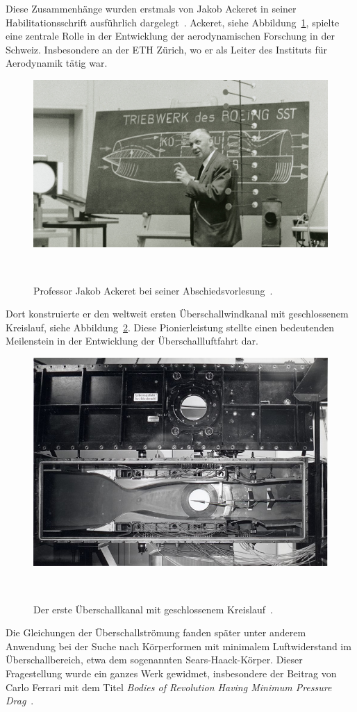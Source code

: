Diese Zusammenhänge wurden erstmals von Jakob Ackeret in 
seiner Habilitationsschrift ausführlich 
dargelegt~\cite{Ackeret1928}.
Ackeret, siehe Abbildung~\ref{fig:ackeret}, 
spielte eine zentrale Rolle in der Entwicklung 
der aerodynamischen Forschung in der Schweiz. 
Insbesondere an der ETH Zürich, wo er als Leiter 
des Instituts für Aerodynamik tätig war.
\begin{figure}
    \centering
    \includegraphics[width=\textwidth]{papers/ueberschall/figures/Jakob_Ackeret_1967.jpg}
    \caption{Professor Jakob Ackeret bei seiner Abschiedsvorlesung~\cite{AckeretFoto1967}.}
    ~\label{fig:ackeret}
\end{figure}
Dort konstruierte er den weltweit ersten 
Überschallwindkanal mit geschlossenem Kreislauf, 
siehe Abbildung~\ref{fig:windkanal}.
Diese Pionierleistung stellte einen bedeutenden 
Meilenstein in der Entwicklung der Überschallluftfahrt dar.
\begin{figure}
    \centering
    \includegraphics[width=\textwidth]{papers/ueberschall/figures/Windkanal.jpg}
    \caption{Der erste Überschallkanal mit geschlossenem Kreislauf~\cite{ETHeritage2020}.}
    ~\label{fig:windkanal}
\end{figure}

Die Gleichungen der Überschallströmung fanden später 
unter anderem Anwendung bei der Suche nach Körperformen 
mit minimalem Luftwiderstand im Überschallbereich, 
etwa dem sogenannten Sears-Haack-Körper.
Dieser Fragestellung wurde ein ganzes Werk gewidmet,
insbesondere der Beitrag von Carlo Ferrari mit dem Titel 
\textit{Bodies of Revolution Having Minimum Pressure Drag}~\cite{Ferrari1965}.

